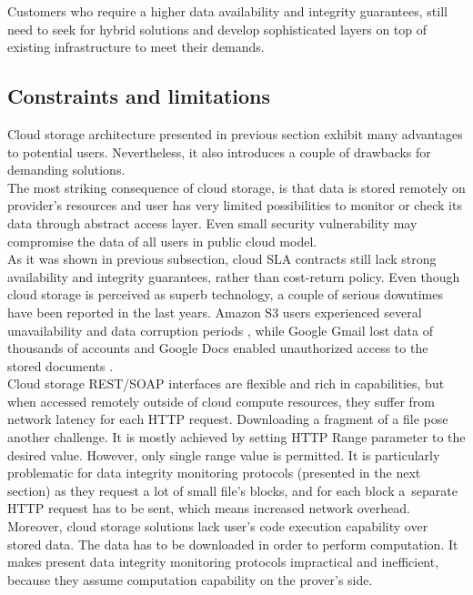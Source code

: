 Customers who require a higher data availability and integrity guarantees,
still need to seek for hybrid solutions and develop sophisticated layers on
top of existing infrastructure to meet their demands.

		\subsection{Constraints and limitations}
Cloud storage architecture presented in previous section exhibit many
advantages to potential users. Nevertheless, it also introduces a couple of
drawbacks for demanding solutions.\\

The most striking consequence of cloud storage, is that data is stored remotely
on provider's resources and user has very limited possibilities to monitor or
check its data through abstract access layer. Even small security vulnerability
may compromise the data of all users in public cloud model.\\

As it was shown in previous subsection, cloud SLA contracts still lack strong
availability and integrity guarantees, rather than cost-return policy. Even
though cloud storage is perceived as superb technology, a couple of serious
downtimes have been reported in the last years. Amazon S3 users experienced
several unavailability and data corruption periods \cite{amazon-downtimes},
while Google Gmail lost data of thousands of accounts \cite{gmail-downtime} and
Google Docs enabled unauthorized access to the stored documents 
\cite{docs-downtime}.\\

Cloud storage REST/SOAP interfaces are flexible and rich in capabilities, but
when accessed remotely outside of cloud compute resources, they suffer from
network latency for each HTTP request. Downloading a fragment of a file pose
another challenge. It is mostly achieved by setting HTTP Range parameter to the
desired value. However, only single range value is permitted. It is particularly
problematic for data integrity monitoring protocols (presented in the next
section) as they request a lot of small file's blocks, and for each block 
a~separate HTTP request has to be sent, which means increased network
overhead.\\

Moreover, cloud storage solutions lack user's code execution capability over
stored data. The data has to be downloaded in order to perform computation. It
makes present data integrity monitoring protocols impractical and inefficient,
because they assume computation capability on the prover's side.

